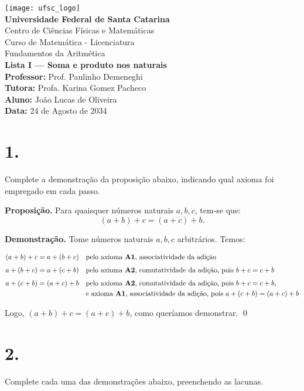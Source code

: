 \documentclass[12pt,a4paper]{article}
\newcommand{\universidade}{Universidade Federal de Santa Catarina}
\newcommand{\centro}{Centro de Ciências Físicas e Matemáticas}
\newcommand{\curso}{Curso de Matemática - Licenciatura}
\newcommand{\disciplina}{Fundamentos da Aritmética}
\newcommand{\professor}{Prof. Paulinho Demeneghi}
\newcommand{\tutora}{Profa. Karina Gomez Pacheco}
\newcommand{\autor}{João Lucas de Oliveira}
\newcommand{\dataentrega}{24 de Agosto de 2034}
\begin{document}
\begin{center}
    \texttt{[image: ufsc\_logo]}\\[0.3cm]
    \textbf{\universidade}\\
    \centro\\
    \curso\\[1cm]
    \disciplina\\
    \textbf{Lista I — Soma e produto nos naturais}\\[0.5cm]
    \textbf{Professor:} \professor \\
    \textbf{Tutora:} \tutora \\
    \textbf{Aluno:} \autor \\
    \textbf{Data:} \dataentrega
\end{center}

\vspace{1cm}

\section*{1.}
Complete a demonstração da proposição abaixo, indicando qual axioma foi empregado em cada passo.

\medskip

\textbf{Proposição.} Para quaisquer números naturais $a, b, c$, tem-se que:
\[
(a + b) + c = (a + c) + b.
\]

\textbf{Demonstração.} Tome números naturais $a, b, c$ arbitrários. Temos:

\[
\begin{aligned}
(a + b) + c &= a + (b + c) 
&& \text{pelo axioma \textbf{A1}, associatividade da adição} \\[4pt]
a + (b + c) &= a + (c + b) 
&& \text{pelo axioma \textbf{A2}, comutatividade da adição, pois } b + c = c + b \\[4pt]
a + (c + b) &= (a + c) + b 
&& \text{pelo axioma \textbf{A2}, comutatividade da adição, pois } b + c = c + b, \\
&&& \text{e axioma \textbf{A1}, associatividade da adição, pois } a + (c + b) = (a + c) + b
\end{aligned}
\]

\medskip

Logo, $(a + b) + c = (a + c) + b$, como queríamos demonstrar. \qed

\section*{2.}
Complete cada uma das demonstrações abaixo, preenchendo as lacunas.
\end{document}
